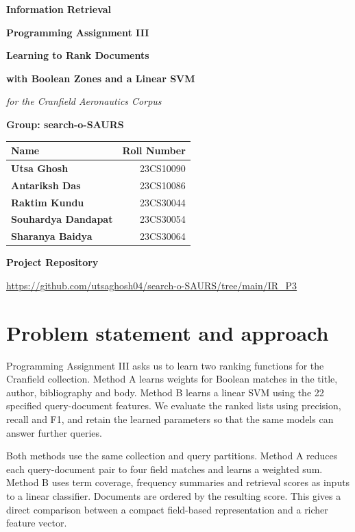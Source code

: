 \documentclass[12pt,a4paper]{article}
\begin{document}
\begin{titlepage}\centering\vspace*{1.65cm}
{\LARGE\bfseries Information Retrieval}\par\medskip
{\Large\bfseries Programming Assignment III}\par\vspace{2cm}
{\Huge\bfseries Learning to Rank Documents}\par\medskip
{\Huge\bfseries with Boolean Zones and a Linear SVM}\par\medskip
{\Large\itshape for the Cranfield Aeronautics Corpus}\par\vspace{1.65cm}
{\Large\bfseries Group: search-o-SAURS}\par\vspace{1.65cm}
\begin{tabular}{lr}\toprule\textbf{Name} & \textbf{Roll Number} \\\midrule
\textbf{Utsa Ghosh} & 23CS10090 \\
\textbf{Antariksh Das} & 23CS10086 \\
\textbf{Raktim Kundu} & 23CS30044 \\
\textbf{Souhardya Dandapat} & 23CS30054 \\
\textbf{Sharanya Baidya} & 23CS30064 \\
\bottomrule\end{tabular}\vfill
{\large\bfseries Project Repository}\par\medskip
\url{https://github.com/utsaghosh04/search-o-SAURS/tree/main/IR_P3}
\end{titlepage}
\tableofcontents\clearpage
\section{Problem statement and approach}
Programming Assignment III asks us to learn two ranking functions for the Cranfield collection. Method A learns weights for Boolean matches in the title, author, bibliography and body. Method B learns a linear SVM using the 22 specified query-document features. We evaluate the ranked lists using precision, recall and F1, and retain the learned parameters so that the same models can answer further queries.

Both methods use the same collection and query partitions. Method A reduces each query-document pair to four field matches and learns a weighted sum. Method B uses term coverage, frequency summaries and retrieval scores as inputs to a linear classifier. Documents are ordered by the resulting score. This gives a direct comparison between a compact field-based representation and a richer feature vector.
\end{document}
